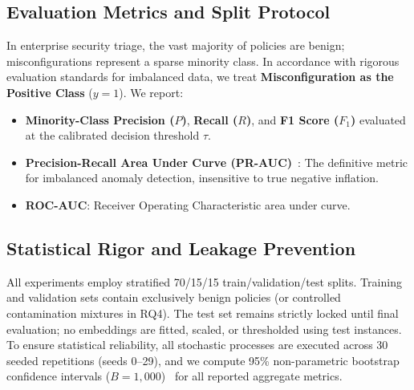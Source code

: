 \subsection{Evaluation Metrics and Split Protocol}
In enterprise security triage, the vast majority of policies are benign; misconfigurations represent a sparse minority class. In accordance with rigorous evaluation standards for imbalanced data, we treat \textbf{Misconfiguration as the Positive Class} ($y=1$). We report:
\begin{itemize}
    \item \textbf{Minority-Class Precision ($P$)}, \textbf{Recall ($R$)}, and \textbf{F1 Score ($F_1$)} evaluated at the calibrated decision threshold $\tau$.
    \item \textbf{Precision-Recall Area Under Curve (PR-AUC)}~\cite{davis2006relationship}: The definitive metric for imbalanced anomaly detection, insensitive to true negative inflation.
    \item \textbf{ROC-AUC}: Receiver Operating Characteristic area under curve.
\end{itemize}

\subsection{Statistical Rigor and Leakage Prevention}
All experiments employ stratified 70/15/15 train/validation/test splits. Training and validation sets contain exclusively benign policies (or controlled contamination mixtures in RQ4). The test set remains strictly locked until final evaluation; no embeddings are fitted, scaled, or thresholded using test instances. To ensure statistical reliability, all stochastic processes are executed across 30 seeded repetitions (seeds 0--29), and we compute 95\% non-parametric bootstrap confidence intervals ($B=1{,}000$)~\cite{efron1979bootstrap} for all reported aggregate metrics.

